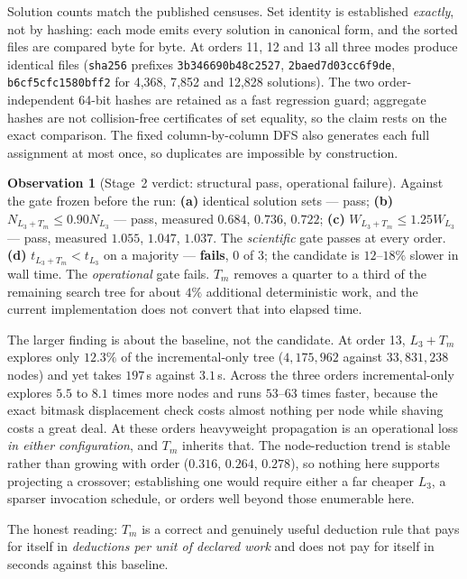\documentclass[11pt,a4paper,oneside]{report}
\theoremstyle{definition}
\newtheorem{observation}[theorem]{Observation}
\begin{document}
\noindent Solution counts match the published censuses. Set identity is
established \emph{exactly}, not by hashing: each mode emits every solution in
canonical form, and the sorted files are compared byte for byte. At orders 11,
12 and 13 all three modes produce identical files
(\texttt{sha256} prefixes \texttt{3b346690b48c2527}, \texttt{2baed7d03cc6f9de},
\texttt{b6cf5cfc1580bff2} for 4{,}368, 7{,}852 and 12{,}828 solutions). The two
order-independent 64-bit hashes are retained as a fast regression guard;
aggregate hashes are not collision-free certificates of set equality, so the
claim rests on the exact comparison. The fixed column-by-column DFS also
generates each full assignment at most once, so duplicates are impossible by
construction.

\begin{observation}[Stage~2 verdict: structural pass, operational failure]
\label{p5-obs:f3prime}
Against the gate frozen before the run: \textbf{(a)} identical solution sets ---
pass; \textbf{(b)} $N_{L_3+T_m}\le0.90N_{L_3}$ --- pass, measured $0.684$,
$0.736$, $0.722$; \textbf{(c)} $W_{L_3+T_m}\le1.25W_{L_3}$ --- pass, measured
$1.055$, $1.047$, $1.037$. The \emph{scientific} gate passes at every order.
\textbf{(d)} $t_{L_3+T_m}<t_{L_3}$ on a majority --- \textbf{fails}, 0 of 3; the
candidate is $12$--$18\%$ slower in wall time. The \emph{operational} gate fails.
$T_m$ removes a quarter to a third of the remaining search tree for about $4\%$
additional deterministic work, and the current implementation does not convert
that into elapsed time.
\end{observation}

The larger finding is about the baseline, not the candidate. At order 13,
$L_3+T_m$ explores only $12.3\%$ of the incremental-only tree
($4{,}175{,}962$ against $33{,}831{,}238$ nodes) and yet takes $197$\,s against
$3.1$\,s. Across the three orders incremental-only explores $5.5$ to $8.1$ times
more nodes and runs $53$--$63$ times faster, because the exact bitmask displacement
check costs almost nothing per node while shaving costs a great deal. At these
orders heavyweight propagation is an operational loss \emph{in either
configuration}, and $T_m$ inherits that. The node-reduction trend is stable
rather than growing with order ($0.316$, $0.264$, $0.278$), so nothing here
supports projecting a crossover; establishing one would require either a far
cheaper $L_3$, a sparser invocation schedule, or orders well beyond those
enumerable here.

The honest reading: $T_m$ is a correct and genuinely useful deduction rule that
pays for itself in \emph{deductions per unit of declared work} and does not pay
for itself in seconds against this baseline.
\end{document}
